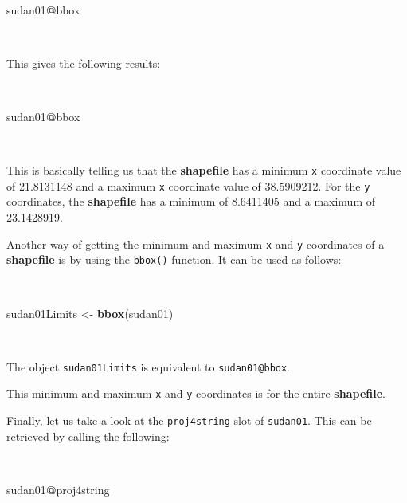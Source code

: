 \documentclass[12pt,a4paper,a4paper]{book}
\newenvironment{Shaded}{\begin{snugshade}}{\end{snugshade}}
\newcommand{\KeywordTok}[1]{\textcolor[rgb]{0.13,0.29,0.53}{\textbf{#1}}}
\newcommand{\StringTok}[1]{\textcolor[rgb]{0.31,0.60,0.02}{#1}}
\newcommand{\OperatorTok}[1]{\textcolor[rgb]{0.81,0.36,0.00}{\textbf{#1}}}
\newcommand{\NormalTok}[1]{#1}
\theoremstyle{definition}
\theoremstyle{definition}
\theoremstyle{definition}
\theoremstyle{remark}
\begin{document}
~

\begin{Shaded}
\begin{Highlighting}[]
\NormalTok{sudan01}\OperatorTok{@}\NormalTok{bbox}
\end{Highlighting}
\end{Shaded}

~

This gives the following results:

~

\begin{Shaded}
\begin{Highlighting}[]
\NormalTok{sudan01}\OperatorTok{@}\NormalTok{bbox}
\end{Highlighting}
\end{Shaded}

~

This is basically telling us that the \textbf{shapefile} has a minimum
\texttt{x} coordinate value of 21.8131148 and a maximum \texttt{x}
coordinate value of 38.5909212. For the \texttt{y} coordinates, the
\textbf{shapefile} has a minimum of 8.6411405 and a maximum of
23.1428919.

Another way of getting the minimum and maximum \texttt{x} and \texttt{y}
coordinates of a \textbf{shapefile} is by using the \texttt{bbox()}
function. It can be used as follows:

~

\begin{Shaded}
\begin{Highlighting}[]
\NormalTok{sudan01Limits <-}\StringTok{ }\KeywordTok{bbox}\NormalTok{(sudan01)}
\end{Highlighting}
\end{Shaded}

~

The object \texttt{sudan01Limits} is equivalent to
\texttt{sudan01@bbox}.

This minimum and maximum \texttt{x} and \texttt{y} coordinates is for
the entire \textbf{shapefile}.

Finally, let us take a look at the \texttt{proj4string} slot of
\texttt{sudan01}. This can be retrieved by calling the following:

~

\begin{Shaded}
\begin{Highlighting}[]
\NormalTok{sudan01}\OperatorTok{@}\NormalTok{proj4string}
\end{Highlighting}
\end{Shaded}
\end{document}
